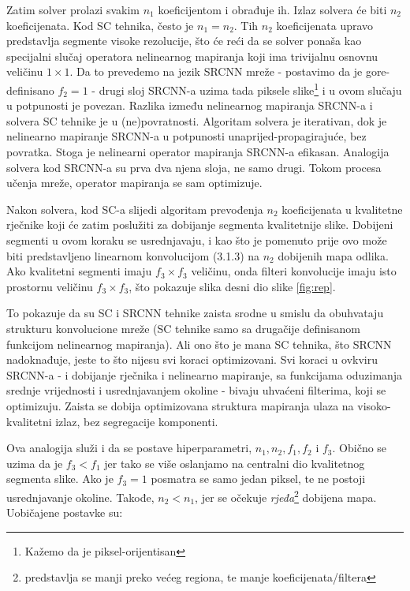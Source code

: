 \documentclass[12pt]{report}
\numberwithin{equation}{section}
\begin{document}
Zatim solver prolazi svakim $n_1$ koeficijentom i obrađuje ih. Izlaz solvera će biti $n_2$ koeficijenata. Kod SC tehnika, često je $n_1 = n_2$. Tih $n_2$ koeficijenata upravo predstavlja segmente visoke rezolucije, što će reći da se solver ponaša kao specijalni slučaj operatora nelinearnog mapiranja koji ima trivijalnu osnovnu veličinu $1 \times 1$. Da to prevedemo na jezik SRCNN mreže - postavimo da je gore-definisano $f_2 = 1$  - drugi sloj SRCNN-a uzima tada piksele slike\footnote{Kažemo da je piksel-orijentisan} i u ovom slučaju u potpunosti je povezan. Razlika između nelinearnog mapiranja SRCNN-a i solvera SC tehnike je u (ne)povratnosti. Algoritam solvera je iterativan, dok je nelinearno mapiranje SRCNN-a u potpunosti unaprijed-propagirajuće, bez povratka. Stoga je nelinearni operator mapiranja SRCNN-a efikasan. Analogija solvera kod SRCNN-a su prva dva njena sloja, ne samo drugi. Tokom procesa učenja mreže, operator mapiranja se sam optimizuje.     


Nakon solvera, kod SC-a slijedi algoritam prevođenja $n_2$ koeficijenata u kvalitetne rječnike koji će zatim poslužiti  za dobijanje segmenta kvalitetnije slike. Dobijeni segmenti u ovom koraku se usrednjavaju, i kao što je pomenuto prije ovo može biti predstavljeno linearnom konvolucijom (3.1.3) na $n_2$ dobijenih mapa odlika. Ako kvalitetni segmenti imaju $f_3 \times f_3$ veličinu, onda filteri konvolucije imaju isto prostornu veličinu $f_3 \times f_3$, što pokazuje slika desni dio slike \ref{fig:rep}. 

To pokazuje da su SC i SRCNN tehnike zaista srodne u smislu da obuhvataju strukturu konvolucione mreže (SC tehnike samo sa drugačije definisanom funkcijom nelinearnog mapiranja). Ali ono što je mana SC tehnika, što SRCNN nadoknađuje, jeste to što nijesu svi koraci optimizovani. Svi koraci u ovkviru SRCNN-a - i dobijanje rječnika i nelinearno mapiranje, sa funkcijama oduzimanja srednje vrijednosti i usrednjavanjem okoline - bivaju uhvaćeni filterima, koji se optimizuju. Zaista se dobija optimizovana struktura mapiranja ulaza na visoko-kvalitetni izlaz, bez segregacije komponenti. 

Ova analogija služi i da se postave hiperparametri, $n_1, n_2, f_1, f_2$ i $f_3$.  Obično se uzima da je $f_3 < f_1$ jer tako se više oslanjamo na centralni dio kvalitetnog segmenta slike. Ako je $f_3 = 1$ posmatra se samo jedan piksel, te ne postoji usrednjavanje okoline. Takođe, $n_2 < n_1$, jer se očekuje \textit{rjeđa}\footnote{predstavlja se manji preko većeg regiona, te manje koeficijenata/filtera} dobijena mapa. Uobičajene postavke su: 
\end{document}
